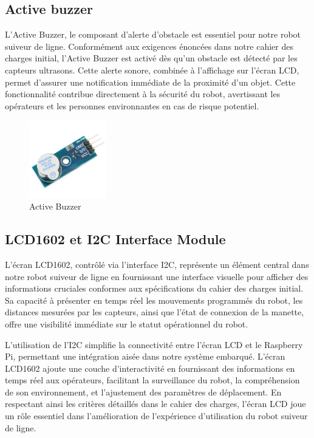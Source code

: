 \subsection{Active buzzer}
L'Active Buzzer, le composant d'alerte d'obstacle est essentiel pour notre robot suiveur de ligne. Conformément aux exigences énoncées dans notre cahier des charges initial, l'Active Buzzer est activé dès qu'un obstacle est détecté par les capteurs ultrasons. Cette alerte sonore, combinée à l'affichage sur l'écran LCD, permet d'assurer une notification immédiate de la proximité d'un objet. Cette fonctionnalité contribue directement à la sécurité du robot, avertissant les opérateurs et les personnes environnantes en cas de risque potentiel.

\begin{figure}[h]
    \centering
    \includegraphics[width=0.3\textwidth]{images/active_buzzer.jpg}
    \caption{Active Buzzer}
    \label{fig:Active Buzzer}
\end{figure}

\subsection{LCD1602 et I2C Interface Module}
L'écran LCD1602, contrôlé via l'interface I2C, représente un élément central dans notre robot suiveur de ligne en fournissant une interface visuelle pour afficher des informations cruciales conformes aux spécifications du cahier des charges initial. Sa capacité à présenter en temps réel les mouvements programmés du robot, les distances mesurées par les capteurs, ainsi que l'état de connexion de la manette, offre une visibilité immédiate sur le statut opérationnel du robot.

L'utilisation de l'I2C simplifie la connectivité entre l'écran LCD et le Raspberry Pi, permettant une intégration aisée dans notre système embarqué. L'écran LCD1602 ajoute une couche d'interactivité en fournissant des informations en temps réel aux opérateurs, facilitant la surveillance du robot, la compréhension de son environnement, et l'ajustement des paramètres de déplacement. En respectant ainsi les critères détaillés dans le cahier des charges, l'écran LCD joue un rôle essentiel dans l'amélioration de l'expérience d'utilisation du robot suiveur de ligne.

